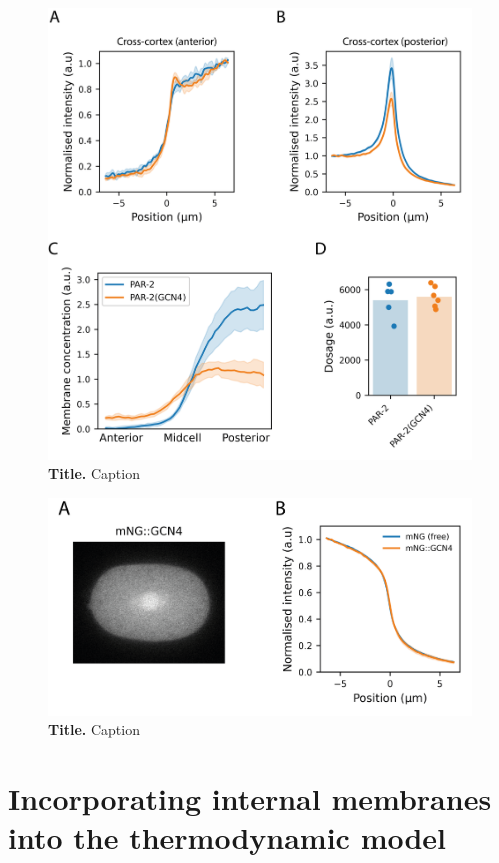 \documentclass[12pt]{"report"}
\newcommand{\mycaption}[2]{\caption[#1]{\textbf{#1.} #2}}
\begin{document}
\begin{figure}[!h]
\includegraphics[scale=1]{gcn4_quantification}
\setlength{\abovecaptionskip}{20pt}
\centering
\mycaption{Title}{Caption}
\label{fig:gcn4_quantification}
\end{figure}

\begin{figure}[!h]
\includegraphics[scale=1]{gcn4_alone}
\setlength{\abovecaptionskip}{20pt}
\centering
\mycaption{Title}{Caption}
\label{fig:gcn4_alone}
\end{figure}

\clearpage
\section{Incorporating internal membranes into the thermodynamic model}
\end{document}
